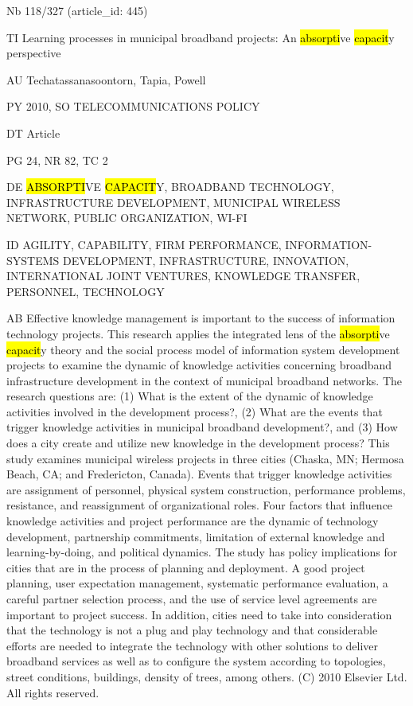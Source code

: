 \documentclass[a4paper]{article}
\begin{document}
\vspace*{-2cm}
Nb \tabto{0cm}118/327 (article\_id: 445)\par
TI \tabto{0cm}Learning processes in municipal broadband projects: An \hl{absorpti}ve \hl{capacit}y perspective\par
AU \tabto{0cm}Techatassanasoontorn, Tapia, Powell\par
PY \tabto{0cm}2010, SO TELECOMMUNICATIONS POLICY\par
DT \tabto{0cm}Article\par
PG \tabto{0cm}24, NR 82, TC 2\par
DE \tabto{0cm}\hl{ABSORPTI}VE \hl{CAPACIT}Y, BROADBAND TECHNOLOGY, INFRASTRUCTURE DEVELOPMENT, MUNICIPAL WIRELESS NETWORK, PUBLIC ORGANIZATION, WI-FI\par
ID \tabto{0cm}AGILITY, CAPABILITY, FIRM PERFORMANCE, INFORMATION-SYSTEMS DEVELOPMENT, INFRASTRUCTURE, INNOVATION, INTERNATIONAL JOINT VENTURES, KNOWLEDGE TRANSFER, PERSONNEL, TECHNOLOGY\par
AB \tabto{0cm}Effective knowledge management is important to the success of information technology projects. This research applies the integrated lens of the \hl{absorpti}ve \hl{capacit}y theory and the social process model of information system development projects to examine the dynamic of knowledge activities concerning broadband infrastructure development in the context of municipal broadband networks. The research questions are: (1) What is the extent of the dynamic of knowledge activities involved in the development process?, (2) What are the events that trigger knowledge activities in municipal broadband development?, and (3) How does a city create and utilize new knowledge in the development process? This study examines municipal wireless projects in three cities (Chaska, MN; Hermosa Beach, CA; and Fredericton, Canada). Events that trigger knowledge activities are assignment of personnel, physical system construction, performance problems, resistance, and reassignment of organizational roles. Four factors that influence knowledge activities and project performance are the dynamic of technology development, partnership commitments, limitation of external knowledge and learning-by-doing, and political dynamics. The study has policy implications for cities that are in the process of planning and deployment. A good project planning, user expectation management, systematic performance evaluation, a careful partner selection process, and the use of service level agreements are important to project success. In addition, cities need to take into consideration that the technology is not a plug and play technology and that considerable efforts are needed to integrate the technology with other solutions to deliver broadband services as well as to configure the system according to topologies, street conditions, buildings, density of trees, among others. (C) 2010 Elsevier Ltd. All rights reserved.\par
\clearpage
\end{document}
